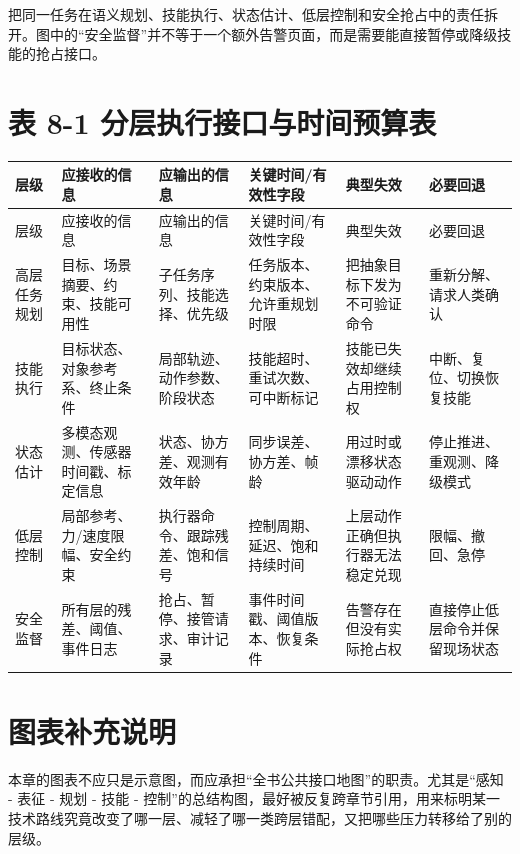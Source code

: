 \texttt{} 把同一任务在语义规划、技能执行、状态估计、低层控制和安全抢占中的责任拆开。图中的“安全监督”并不等于一个额外告警页面，而是需要能直接暂停或降级技能的抢占接口。

\section*{表 8-1 分层执行接口与时间预算表}

\begingroup
\small
\begin{xltabular}{\textwidth}{YYYYYY}
\toprule
层级 & 应接收的信息 & 应输出的信息 & 关键时间/有效性字段 & 典型失效 & 必要回退 \\
\midrule
\endfirsthead
\toprule
层级 & 应接收的信息 & 应输出的信息 & 关键时间/有效性字段 & 典型失效 & 必要回退 \\
\midrule
\endhead
高层任务规划 & 目标、场景摘要、约束、技能可用性 & 子任务序列、技能选择、优先级 & 任务版本、约束版本、允许重规划时限 & 把抽象目标下发为不可验证命令 & 重新分解、请求人类确认 \\
技能执行 & 目标状态、对象参考系、终止条件 & 局部轨迹、动作参数、阶段状态 & 技能超时、重试次数、可中断标记 & 技能已失效却继续占用控制权 & 中断、复位、切换恢复技能 \\
状态估计 & 多模态观测、传感器时间戳、标定信息 & 状态、协方差、观测有效年龄 & 同步误差、协方差、帧龄 & 用过时或漂移状态驱动动作 & 停止推进、重观测、降级模式 \\
低层控制 & 局部参考、力/速度限幅、安全约束 & 执行器命令、跟踪残差、饱和信号 & 控制周期、延迟、饱和持续时间 & 上层动作正确但执行器无法稳定兑现 & 限幅、撤回、急停 \\
安全监督 & 所有层的残差、阈值、事件日志 & 抢占、暂停、接管请求、审计记录 & 事件时间戳、阈值版本、恢复条件 & 告警存在但没有实际抢占权 & 直接停止低层命令并保留现场状态 \\
\bottomrule
\end{xltabular}
\endgroup

\section*{图表补充说明}

本章的图表不应只是示意图，而应承担“全书公共接口地图”的职责。尤其是“感知 - 表征 - 规划 - 技能 - 控制”的总结构图，最好被反复跨章节引用，用来标明某一技术路线究竟改变了哪一层、减轻了哪一类跨层错配，又把哪些压力转移给了别的层级。

